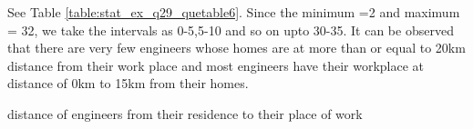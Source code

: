 	  See Table 	\ref{table:stat_ex_q29_quetable6}.
Since the minimum =2 and maximum = 32, we take the intervals as 0-5,5-10 and so on upto 30-35. It can be observed that there are very few engineers whose homes are at more than or equal to 20km distance from their work place and most engineers have their workplace at distance of 0km to 15km from their homes.
	\begin{table}[ht]
	\begin{center}
    	
	\caption{distance of engineers from their residence to their place of work }
	\label{table:stat_ex_q29_quetable6}
	\end{center}
	\end{table}

	
